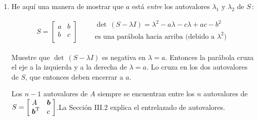 \documentclass[12pt,a4paper]{article}
\newcommand{\bi}[1]{\hbox{\boldmath$#1$}}
\newcommand\1{\mbox{\,\vrule height-0.8pt depth1.0pt width2pc\,}}
\newcommand\2{\mbox{\,\vrule height-0.8pt depth1.0pt width1pc\,}}
\DeclareRobustCommand\transp{^{\mathrm{T}}}
\newcommand{\embf}[1]{\emph{\bfseries{#1}}}
\newcommand{\la}{\lambda}
\begin{document}
\begin{enumerate}
\quad\; Tienen la misma cantidad de autovalores positivos, negativos y cero: \embf{Ley de inercia}.

\item He aquí una manera de mostrar que $a$ está \emph{entre} los autovalores $\la_1$ y $\la_2$ de $S$\,:

\vspace{-5pt}
$$
S=\left[\begin{array}{ll}
a&b\\
b&c\\
\end{array}\right]\qquad \begin{array}{l}
\det\,(S-\la I)=\la^2-a\la-c\la+ac-b^2\\
\text{es una parábola hacia arriba (debido a $\la^2$)}\\
\end{array}
$$

\noindent
Muestre que $\det\,(S-\la I)$ es negativa en $\la=a$. Entonces la parábola cruza el eje a la izquierda y a la derecha de $\la=a$. Lo cruza en los dos autovalores de $S$, que entonces deben encerrar a $a$.

Los $n-1$ autovalores de $A$ siempre se encuentran entre los $n$ autovalores de $S=\left[\begin{array}{@{\;}ll@{\;}}
A&\bi{b}\\
\bi{b}\transp&c\\
\end{array}\right]$.\linebreak La Sección III.2 explica el entrelazado de autovalores.


\end{enumerate}
\end{document}
